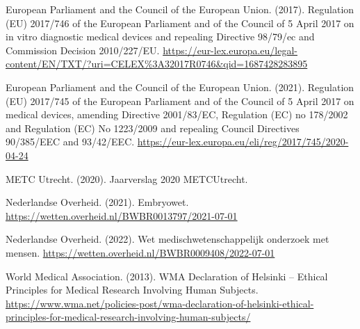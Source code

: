 \documentclass[authordate, meta, issue]{jote-new-article}
\begin{document}
European Parliament and the Council of the European Union. (2017). Regulation (EU) 2017/746 of the European Parliament and of the Council of 5 April 2017 on in vitro diagnostic medical devices and repealing Directive 98/79/ec and Commission Decision 2010/227/EU. \url{https://eur-lex.europa.eu/legal-content/EN/TXT/?uri=CELEX%3A32017R0746&qid=1687428283895}

European Parliament and the Council of the European Union. (2021). Regulation (EU) 2017/745 of the European Parliament and of the Council of 5 April 2017 on medical devices, amending Directive 2001/83/EC, Regulation (EC) no 178/2002 and Regulation (EC) No 1223/2009 and repealing Council Directives 90/385/EEC and 93/42/EEC. \url{https://eur-lex.europa.eu/eli/reg/2017/745/2020-04-24}

METC Utrecht. (2020). Jaarverslag 2020 METCUtrecht.

Nederlandse Overheid. (2021). Embryowet. \url{https://wetten.overheid.nl/BWBR0013797/2021-07-01}

Nederlandse Overheid. (2022). Wet medischwetenschappelijk onderzoek met mensen. \url{https://wetten.overheid.nl/BWBR0009408/2022-07-01}

World Medical Association. (2013). WMA Declaration of Helsinki – Ethical Principles for Medical Research Involving Human Subjects. \url{https://www.wma.net/policies-post/wma-declaration-of-helsinki-ethical-principles-for-medical-research-involving-human-subjects/}
\end{document}
